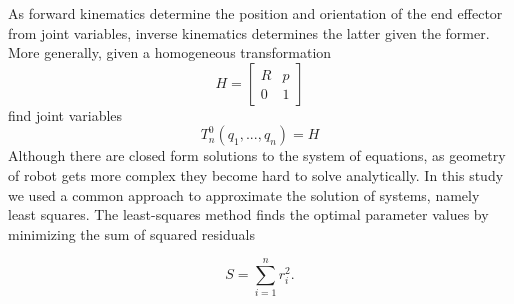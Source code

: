 As forward kinematics determine the position and orientation of the end effector from joint variables, inverse kinematics determines the latter given the former. More generally, given a homogeneous transformation
$$
H = 
\begin{bmatrix}
R & p \\
0 & 1
\end{bmatrix}
$$
find joint variables
$$
T_n^0(q_1,...,q_n) = H
$$
Although there are closed form solutions to the system of equations, as geometry of robot gets more complex they become hard to solve analytically. In this study we used a common approach to approximate the solution of systems, namely least squares. The least-squares method finds the optimal parameter values by  minimizing the sum of squared residuals

$$S=\sum_{i=1}^{n}r_i^2.$$